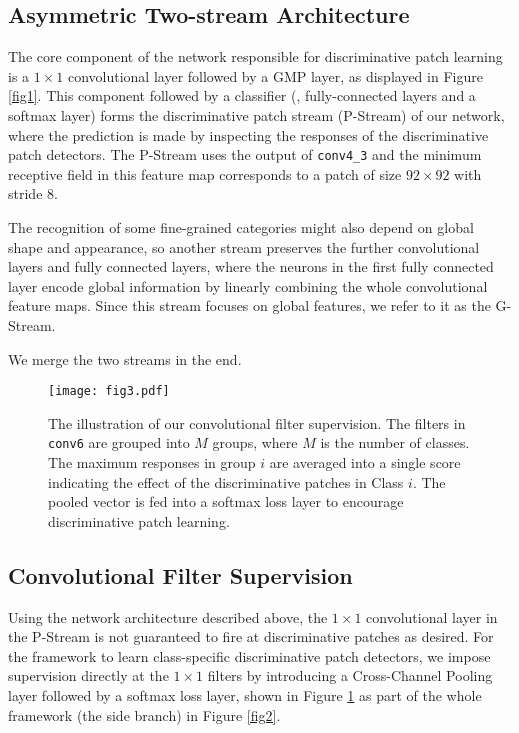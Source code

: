 \documentclass[10pt,twocolumn,letterpaper]{article}
\begin{document}
\subsection{Asymmetric Two-stream Architecture} \label{sec3_2}
The core component of the network responsible for discriminative patch learning is a $1\times1$ convolutional
layer followed by a GMP layer, as displayed in Figure \ref{fig1}. 
This component followed by a classifier (\eg, fully-connected layers and a softmax layer) forms the discriminative patch
stream (P-Stream) of our network, where the prediction is made by inspecting the responses of the discriminative patch
detectors. The P-Stream uses the output of \texttt{conv4\_3} and the minimum receptive field in
this feature map corresponds to a patch of size $92\times92$ with stride 8.

The recognition of some fine-grained categories might also depend on global shape and appearance, so another stream
preserves the further convolutional layers
and fully connected layers, where the neurons in the first fully connected layer encode global information by
linearly combining the whole convolutional feature maps. Since this stream focuses on global features, we refer to it as the G-Stream.

We merge the two streams in the end.

\begin{figure}
\begin{center}
\texttt{[image: fig3.pdf]}
\end{center}
\vspace{-10pt}
   \caption{\label{fig3} The illustration of our convolutional filter supervision. The filters in \texttt{conv6} are
   grouped into $M$ groups, where $M$ is the number of classes. The maximum responses in group $i$ are averaged
   into a single score indicating the effect of the discriminative patches in Class $i$. The pooled vector is
   fed into a softmax loss layer to encourage discriminative patch learning.}
\end{figure}

\subsection{Convolutional Filter Supervision} \label{sec3_3}
Using the network architecture described above, the $1\times1$ convolutional layer in the P-Stream is not guaranteed to fire at
discriminative patches as desired. For the framework to learn class-specific discriminative patch detectors, we impose supervision
directly at the $1\times1$ filters by introducing a Cross-Channel Pooling layer followed by a softmax loss layer,
shown in Figure \ref{fig3} as part of the whole framework (the side branch) in Figure \ref{fig2}.
\end{document}
